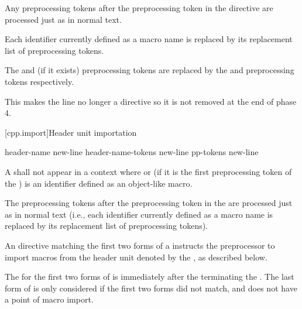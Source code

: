 \pnum
Any preprocessing tokens after the  preprocessing token
in the  directive are processed just as in normal text.
\begin{note}
Each identifier currently defined as a macro name
is replaced by its replacement list of preprocessing tokens.
\end{note}

\pnum
The  and  (if it exists) preprocessing tokens
are replaced by the  and
 preprocessing tokens respectively.
\begin{note}
This makes the line no longer a directive
so it is not removed at the end of phase 4.
\end{note}

[cpp.import]{Header unit importation}
%
%
%

\begin{bnf}
\br
      header-name  \terminal{;} new-line\br
      header-name-tokens  \terminal{;} new-line\br
      pp-tokens \terminal{;} new-line
\end{bnf}

\pnum
A  shall not
appear in a context where 
or (if it is the first preprocessing token of the ) 
is an identifier defined as an object-like macro.

\pnum
The preprocessing tokens after the  preprocessing token
in the  
are processed just as in normal text
(i.e., each identifier currently defined as a macro name
is replaced by its replacement list of preprocessing tokens).
\begin{note}
An  directive
matching the first two forms of a 
instructs the preprocessor to import macros
from the header unit
denoted by the ,
as described below.
\end{note}
%
The  for the
first two forms of  is
immediately after the  terminating
the .
The last form of  is only considered
if the first two forms did not match, and
does not have a point of macro import.

